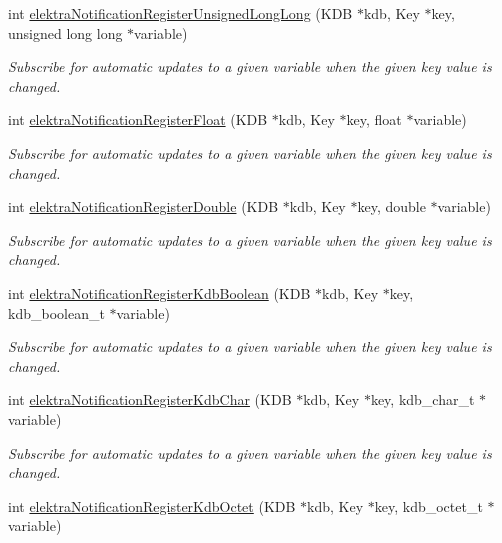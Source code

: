 \begin{DoxyCompactItemize}
int \mbox{\hyperlink{group__kdbnotification_ga69673c57ef694bb6d5d383eaf89750dd}{elektra\+Notification\+Register\+Unsigned\+Long\+Long}} (K\+DB $\ast$kdb, Key $\ast$key, unsigned long long $\ast$variable)
\begin{DoxyCompactList}\small\item\em Subscribe for automatic updates to a given variable when the given key value is changed. \end{DoxyCompactList}\item 
int \mbox{\hyperlink{group__kdbnotification_gad4edf91428d39b3255dffd4b01bc0754}{elektra\+Notification\+Register\+Float}} (K\+DB $\ast$kdb, Key $\ast$key, float $\ast$variable)
\begin{DoxyCompactList}\small\item\em Subscribe for automatic updates to a given variable when the given key value is changed. \end{DoxyCompactList}\item 
int \mbox{\hyperlink{group__kdbnotification_ga03367f9caa0b6cce1579bc5d690729f4}{elektra\+Notification\+Register\+Double}} (K\+DB $\ast$kdb, Key $\ast$key, double $\ast$variable)
\begin{DoxyCompactList}\small\item\em Subscribe for automatic updates to a given variable when the given key value is changed. \end{DoxyCompactList}\item 
int \mbox{\hyperlink{group__kdbnotification_gae6546ac973124e44c456f945086b6c3a}{elektra\+Notification\+Register\+Kdb\+Boolean}} (K\+DB $\ast$kdb, Key $\ast$key, kdb\+\_\+boolean\+\_\+t $\ast$variable)
\begin{DoxyCompactList}\small\item\em Subscribe for automatic updates to a given variable when the given key value is changed. \end{DoxyCompactList}\item 
int \mbox{\hyperlink{group__kdbnotification_ga3a7d85507eb0afcdbf2598b9bf03b819}{elektra\+Notification\+Register\+Kdb\+Char}} (K\+DB $\ast$kdb, Key $\ast$key, kdb\+\_\+char\+\_\+t $\ast$variable)
\begin{DoxyCompactList}\small\item\em Subscribe for automatic updates to a given variable when the given key value is changed. \end{DoxyCompactList}\item 
int \mbox{\hyperlink{group__kdbnotification_ga5f969cbf9fc58f199c91d03d2bed8e56}{elektra\+Notification\+Register\+Kdb\+Octet}} (K\+DB $\ast$kdb, Key $\ast$key, kdb\+\_\+octet\+\_\+t $\ast$variable)

\end{DoxyCompactItemize}

